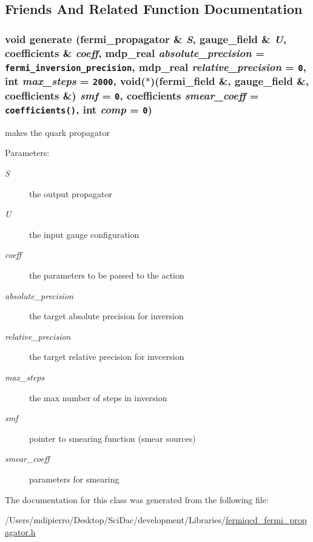 \subsection{Friends And Related Function Documentation}
\hypertarget{classfermi__propagator_0b3730ff1e1058f1e13b537d429c7333}{
\subsubsection[{generate}]{\setlength{\rightskip}{0pt plus 5cm}void generate ({\bf fermi\_\-propagator} \& {\em S}, \/  {\bf gauge\_\-field} \& {\em U}, \/  {\bf coefficients} \& {\em coeff}, \/  mdp\_\-real {\em absolute\_\-precision} = {\tt fermi\_\-inversion\_\-precision}, \/  mdp\_\-real {\em relative\_\-precision} = {\tt 0}, \/  int {\em max\_\-steps} = {\tt 2000}, \/  void($\ast$)({\bf fermi\_\-field} \&, {\bf gauge\_\-field} \&, {\bf coefficients} \&) {\em smf} = {\tt 0}, \/  {\bf coefficients} {\em smear\_\-coeff} = {\tt {\bf coefficients}()}, \/  int {\em comp} = {\tt 0})}}
\label{classfermi__propagator_0b3730ff1e1058f1e13b537d429c7333}


makes the quark propagator

\begin{Desc}
\item[Parameters:]
\begin{description}
\item[{\em S}]the output propagator \item[{\em U}]the input gauge configuration \item[{\em coeff}]the parameters to be passed to the action \item[{\em absolute\_\-precision}]the target absolute precision for inversion \item[{\em relative\_\-precision}]the target relative precision for invcersion \item[{\em max\_\-steps}]the max number of steps in inversion \item[{\em smf}]pointer to smearing function (smear sources) \item[{\em smear\_\-coeff}]parameters for smearing \end{description}
\end{Desc}


The documentation for this class was generated from the following file:\begin{CompactItemize}
\item 
/Users/mdipierro/Desktop/SciDac/development/Libraries/\hyperlink{fermiqcd__fermi__propagator_8h}{fermiqcd\_\-fermi\_\-propagator.h}\end{CompactItemize}
